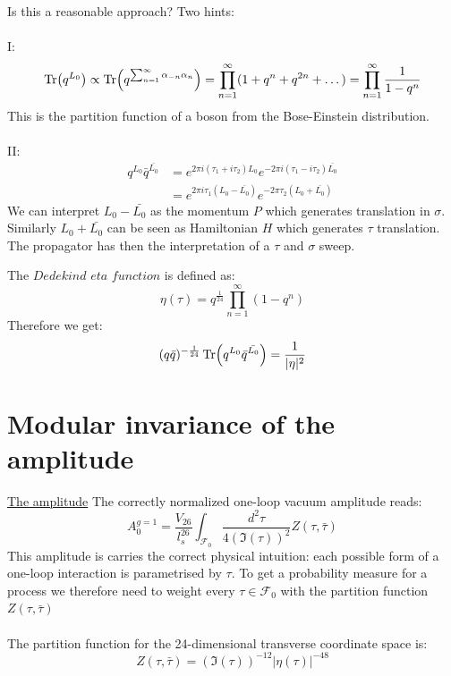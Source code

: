 \documentclass[11pt,aspectratio=169]{beamer}
\begin{document}
\begin{frame}
	Is this a reasonable approach? Two hints:
	\\~\\
	I:
	\begin{equation}
		\Tr(q^{L_0}) \propto \Tr(q^{\sum_{n=1}^{\infty}\alpha_{-n}\alpha_n}) = \prod_{n=1}^{\infty}(1 + q^n + q^{2n} + \dots) = \prod_{n=1}^{\infty}\frac{1}{1-q^n}	
	\end{equation}
	This is the partition function of a boson from the Bose-Einstein distribution.
	\\~\\
	II:
	\begin{align*}
		q^{L_0}\bar{q}^{\bar{L_0}} &= e^{2\pi i (\tau_1 + i \tau_2)L_0}e^{-2\pi i (\tau_1 - i \tau_2)\bar{L_0}}\\
		&= e^{2 \pi i \tau_1 (L_0 - \bar{L_0})}e^{-2\pi \tau_2 (L_0 + \bar{L_0})}
	\end{align*}
	We can interpret $L_0 - \bar{L_0}$ as the momentum $P$ which generates translation in $\sigma$. Similarly $L_0 + \bar{L_0}$ can be seen as Hamiltonian $H$ which generates $\tau$ translation.
	\\
	The propagator has then the interpretation of a $\tau$ and $\sigma$ sweep.

\end{frame}

\begin{frame}
	The $\textit{Dedekind eta function}$ is defined as:
	\begin{equation}
		\eta(\tau) = q^{\frac{1}{24}}\prod_{n=1}^{\infty}(1 - q^n)
	\end{equation}
	Therefore we get:
	\begin{equation}
		(q\bar{q})^{-\frac{1}{24}}\Tr(q^{L_0}\bar{q}^{\bar{L_0}}) = \frac{1}{|\eta|^2}
	\end{equation}
	
\end{frame}


\section{Modular invariance of the amplitude}

\begin{frame}{\underline{The amplitude}}
	The correctly normalized one-loop vacuum amplitude reads:
	\begin{equation}
		A_0^{g=1} = \frac{V_{26}}{l_s^{26}}\int_{\mathcal{F}_0}\frac{d^2\tau}{4(\Im(\tau))^2}Z(\tau, \bar{\tau})
	\end{equation}
	This amplitude is carries the correct physical intuition: each possible form of a one-loop interaction is parametrised by $\tau$.
	To get a probability measure for a process we therefore need to weight every $\tau \in \mathcal{F}_0$ with the partition function $Z(\tau, \bar{\tau})$
	\\~\\
	The partition function for the 24-dimensional transverse coordinate space is:
	\begin{equation}
		Z(\tau, \bar{\tau}) = (\Im(\tau))^{-12}|\eta(\tau)|^{-48}
	\end{equation}
\end{frame}
\end{document}
